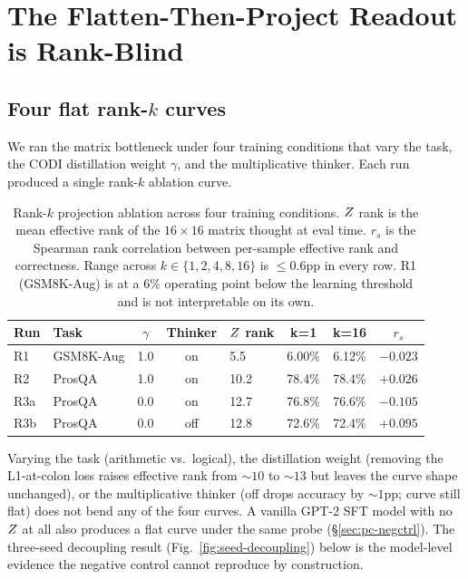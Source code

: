 \section{The Flatten-Then-Project Readout is Rank-Blind}
\label{sec:flat}

\subsection{Four flat rank-$k$ curves}

We ran the matrix bottleneck under four training conditions that
vary the task, the CODI distillation weight $\gamma$, and the
multiplicative thinker. Each run produced a single rank-$k$ ablation
curve.

\begin{table}[t]
\caption{Rank-$k$ projection ablation across four training
conditions. $Z$ rank is the mean effective rank of the $16\times16$
matrix thought at eval time. $r_s$ is the Spearman rank correlation
between per-sample effective rank and correctness. Range across
$k\in\{1,2,4,8,16\}$ is $\leq 0.6$pp in every row. R1 (GSM8K-Aug)
is at a $6\%$ operating point below the learning threshold and is
not interpretable on its own.}
\label{tab:four-flat}
\centering
\footnotesize
\setlength{\tabcolsep}{2pt}
\begin{tabular}{llcclccc}
\toprule
Run & Task & $\gamma$ & Thinker & $Z$ rank & k{=}1 & k{=}16 & $r_s$ \\
\midrule
R1 & GSM8K-Aug & 1.0 & on  & 5.5  & 6.00\% & 6.12\% & $-0.023$ \\
R2 & ProsQA    & 1.0 & on  & 10.2 & 78.4\% & 78.4\% & $+0.026$ \\
R3a & ProsQA   & 0.0 & on  & 12.7 & 76.8\% & 76.6\% & $-0.105$ \\
R3b & ProsQA   & 0.0 & off & 12.8 & 72.6\% & 72.4\% & $+0.095$ \\
\bottomrule
\end{tabular}
\end{table}

Varying the task (arithmetic vs.\ logical), the distillation weight
(removing the L1-at-colon loss raises effective rank from
$\sim\!10$ to $\sim\!13$ but leaves the curve shape unchanged), or
the multiplicative thinker (off drops accuracy by $\sim\!1$pp; curve
still flat) does not bend any of the four curves. A vanilla GPT-2 SFT
model with no $Z$ at all also produces a flat curve under the same
probe (\S\ref{sec:pc-negctrl}). The three-seed decoupling result
(Fig.~\ref{fig:seed-decoupling}) below is the model-level evidence
the negative control cannot reproduce by construction.

